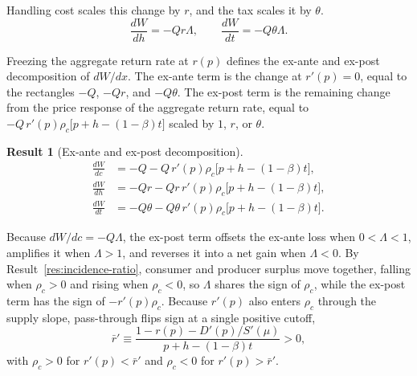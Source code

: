 \documentclass[11pt]{article}
\newtheorem{result}{Result}
\begin{document}
Handling cost scales this change by $r$, and the tax scales it by $\theta$.
\begin{equation}
  \frac{dW}{dh}=-Qr\Lambda,
  \qquad
  \frac{dW}{dt}=-Q\theta\Lambda.
  \label{eq:dW-shocks}
\end{equation}

Freezing the aggregate return rate at $r(p)$ defines the ex-ante and ex-post
decomposition of $dW/dx$. The ex-ante term is the change at $r'(p)=0$, equal
to the rectangles $-Q$, $-Qr$, and $-Q\theta$. The ex-post term is the
remaining change from the price response of the aggregate return rate, equal
to $-Q\,r'(p)\rho_c\bigl[p+h-(1-\beta)t\bigr]$ scaled by $1$, $r$, or
$\theta$.
\begin{result}[Ex-ante and ex-post decomposition]
\label{res:EA-EP}
\begin{align}
  \frac{dW}{dc}
  &=
  -Q-Q\,r'(p)\rho_c\bigl[p+h-(1-\beta)t\bigr],
  \label{eq:dW-decomp} \\
  \frac{dW}{dh}
  &=
  -Qr-Qr\,r'(p)\rho_c\bigl[p+h-(1-\beta)t\bigr], \\
  \frac{dW}{dt}
  &=
  -Q\theta-Q\theta\,r'(p)\rho_c\bigl[p+h-(1-\beta)t\bigr].
\end{align}
\end{result}

Because $dW/dc=-Q\Lambda$, the ex-post term offsets the ex-ante loss when
$0<\Lambda<1$, amplifies it when $\Lambda>1$, and reverses it into a net gain
when $\Lambda<0$. By Result~\ref{res:incidence-ratio}, consumer and producer
surplus move together, falling when $\rho_c>0$ and rising when $\rho_c<0$, so
$\Lambda$ shares the sign of $\rho_c$, while the ex-post term has the sign of
$-r'(p)\rho_c$. Because $r'(p)$ also enters $\rho_c$ through the supply slope,
pass-through flips sign at a single positive cutoff,
\begin{equation}
  \bar{r}'
  \equiv
  \frac{1-r(p)-D'(p)/S'(\mu)}{p+h-(1-\beta)t}
  >0,
  \label{eq:r-thresholds}
\end{equation}
with $\rho_c>0$ for $r'(p)<\bar{r}'$ and $\rho_c<0$ for $r'(p)>\bar{r}'$.
\end{document}
